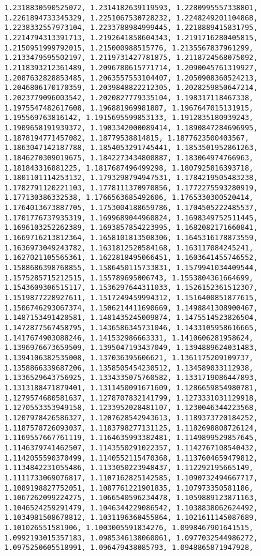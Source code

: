 \documentclass[11pt]{article}
\begin{document}
\begin{Verbatim}[commandchars=\\\{\}]
1.2318830590525072, 1.2314182639119593, 1.2280995557338801, 1.2261894733345329, 1.2251067530728232, 1.2248249201104868, 1.2238332557973104, 1.2233788984999445, 1.2218889415831795, 1.2214794313391713, 1.2192641858604343, 1.2191716280405815, 1.2150951999792015, 1.215000988515776, 1.2135567837961299, 1.2133479595502197, 1.2119731427781875, 1.2118724568075092, 1.2118393212361489, 1.2096780615771714, 1.2090045761319927, 1.2087632828853485, 1.2063557553104407, 1.2050908360524213, 1.2046806170170359, 1.2039848822212305, 1.2028259850647214, 1.2023779096003542, 1.2020827779335104, 1.198317118467338, 1.1975547482617608, 1.196881969981807, 1.1967647015131915, 1.195569763816142, 1.1915695599853133, 1.1912835180939243, 1.1909658191939372, 1.1903342000089414, 1.1890847284696995, 1.1878194771457082, 1.18779538814815, 1.1877623500403567, 1.1863047142187788, 1.1854053291745441, 1.1853501952861263, 1.1846270309019675, 1.1842273434800887, 1.183064974766963, 1.181843316881225, 1.1817687496499298, 1.1807925816393718, 1.1801101114253132, 1.1793298794947531, 1.1784219505483238, 1.1782791120221103, 1.1778111370970856, 1.1772275593280919, 1.177130386332538, 1.1766563685492606, 1.1765330300520414, 1.1764013673887705, 1.1753004188659786, 1.1704505222485537, 1.1701776737935319, 1.1699689044960824, 1.1698349752511445, 1.1696103252262389, 1.1693857854223995, 1.1682082171660841, 1.1669716213812364, 1.1658101813508306, 1.1645316178873559, 1.1636973049243782, 1.1631812520584168, 1.163117084245241, 1.1627021105565361, 1.1622818495066451, 1.1603641455746552, 1.1588686398768855, 1.1586450115733831, 1.1579941034409544, 1.1575285715212515, 1.155789695006743, 1.1553804361664699, 1.1543609306515117, 1.1536297644311033, 1.1526152361512307, 1.1519877228927611, 1.1517249459994312, 1.1516400851877615, 1.1506746293067374, 1.1506214411690669, 1.1498841308900467, 1.1487153491420581, 1.1481435245009874, 1.1475514523826504, 1.1472877567458795, 1.1436586345731046, 1.1433105958616665, 1.1417674903088246, 1.141532986663331, 1.1410606281958624, 1.1396976673659509, 1.1395047193437049, 1.1394889624031483, 1.1394106382535008, 1.137036395606621, 1.1361175209109737, 1.1358866339687206, 1.1358505454230512, 1.134589033112938, 1.1336529643756925, 1.1334335075760582, 1.1331719086447893, 1.1313188471879401, 1.1311450091671609, 1.1286659854980781, 1.1279574680581637, 1.1278707832141799, 1.1273331031129918, 1.1270553353949158, 1.1233952028481107, 1.1230046344223568, 1.1207978426586327, 1.1207628542943613, 1.1189373720184252, 1.1187578726093037, 1.1183798277131125, 1.1182698808726124, 1.1169557667761119, 1.1164635993382481, 1.1149899529857645, 1.1146379741462507, 1.1143550291022357, 1.1142767108540432, 1.1142055590370499, 1.1140552115470368, 1.1137604659479812, 1.1134842231055486, 1.1133050223948437, 1.112292195665149, 1.1111733069076817, 1.1107162825142585, 1.1090732494667717, 1.1089198827752051, 1.1087761221901835, 1.107973350581186, 1.1067262099224275, 1.1066540596234478, 1.1059889123871163, 1.1046524259291479, 1.1046344229086542, 1.1038838062624492, 1.1034981508678812, 1.1031196360455864, 1.1021611145087689, 1.101026551581906, 1.1003005591834276, 1.0998467901641515, 1.0992193015357183, 1.0985346138060061, 1.0977032544986272, 1.0975250605518991, 1.096479438085793, 1.0948865871947928, 
\end{Verbatim}
\end{document}
